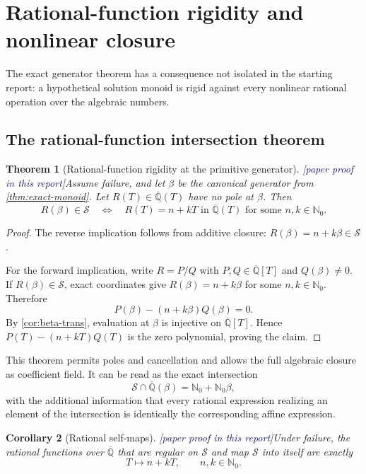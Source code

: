 \documentclass[11pt,oneside]{article}
\newtheorem{theorem}{Theorem}[section]
\newtheorem{corollary}[theorem]{Corollary}
\theoremstyle{definition}
\newcommand{\Nzero}{\mathbb N_0}
\newcommand{\Qbar}{\overline{\mathbb Q}}
\newcommand{\Sol}{\mathcal S}
\newcommand{\tagPaper}{\textcolor{MidnightBlue}{\textsf{[paper proof in this report]}}}
\begin{document}
\section{Rational-function rigidity and nonlinear closure}\label{sec:rational-rigidity}

The exact generator theorem has a consequence not isolated in the starting report: a
hypothetical solution monoid is rigid against every nonlinear rational operation over the
algebraic numbers.

\subsection{The rational-function intersection theorem}

\begin{theorem}[Rational-function rigidity at the primitive generator]\label{thm:rational-rigidity}
\tagPaper Assume failure, and let \(\beta\) be the canonical generator from
\cref{thm:exact-monoid}.  Let \(R(T)\in\Qbar(T)\) have no pole at \(\beta\).  Then
\[
  \boxed{\quad
  R(\beta)\in\Sol
  \quad\Longleftrightarrow\quad
  R(T)=n+kT\text{ in }\Qbar(T)
  \text{ for some }n,k\in\Nzero.
  \quad}
\]
\end{theorem}

\begin{proof}
The reverse implication follows from additive closure:
\(R(\beta)=n+k\beta\in\Sol\).

For the forward implication, write \(R=P/Q\) with \(P,Q\in\Qbar[T]\) and
\(Q(\beta)\ne0\).  If \(R(\beta)\in\Sol\), exact coordinates give
\(R(\beta)=n+k\beta\) for some \(n,k\in\Nzero\).  Therefore
\[
  P(\beta)-(n+k\beta)Q(\beta)=0.
\]
By \cref{cor:beta-trans}, evaluation at \(\beta\) is injective on \(\Qbar[T]\).  Hence
\(P(T)-(n+kT)Q(T)\) is the zero polynomial, proving the claim.
\end{proof}

This theorem permits poles and cancellation and allows the full algebraic closure as
coefficient field.  It can be read as the exact intersection
\[
  \Sol\cap\Qbar(\beta)=\Nzero+\Nzero\beta,
\]
with the additional information that every rational expression realizing an element of
the intersection is identically the corresponding affine expression.

\begin{corollary}[Rational self-maps]\label{cor:rational-selfmaps}
\tagPaper Under failure, the rational functions over \(\Qbar\) that are regular on
\(\Sol\) and map \(\Sol\) into itself are exactly
\[
  T\longmapsto n+kT,
  \qquad n,k\in\Nzero.
\]
\end{corollary}
\end{document}
